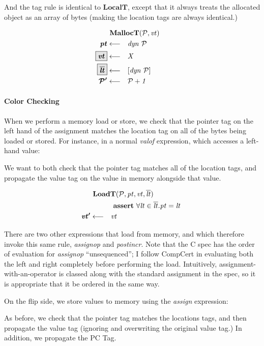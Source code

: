 \documentclass[acmsmall,review,anonymous]{acmart}\settopmatter{printfolios=true,printccs=false,printacmref=false}
\begin{document}
\allocstep

And the tag rule is identical to \(\mathbf{LocalT}\), except that it always treats the allocated
object as an array of bytes (making the location tags are always identical.)

\[\begin{aligned}
\truledef{\malloct}
\settag{\pt}{dyn ~ \PCT}
\settagopt{\vt}{X}
\settagopt{\overline{\lt}}{\left[dyn ~ \PCT\right]}
\settag{\PCT'}{\PCT + 1}
\end{aligned}\]

\paragraph*{Color Checking}

When we perform a memory load or store, we check that the pointer tag on the left hand
of the assignment matches the location tag on all of the bytes being loaded or stored.
For instance, in a normal {\it valof} expression, which accesses a left-hand value:

\valofstep

We want to both check that the pointer tag matches all of the location tags, and propagate the
value tag on the value in memory alongside that value.

\[\begin{aligned}
\truledef{\loadt}
\assert{\forall \lt \in \overline{\lt} . \pt = \lt}
\settag{\vt'}{\vt}
\end{aligned}\]

There are two other expressions that load from memory, and which therefore invoke
this same rule, {\it assignop} and {\it postincr}. Note that the C spec has the order
of evaluation for {\it assignop} ``unsequenced''; I follow CompCert in evaluating both the left
and right completely before performing the load. Intuitively, assignment-with-an-operator is
classed along with the standard assignment in the spec, so it is appropriate that it be ordered
in the same way.

\assignopstep

\postincstep

On the flip side, we store values to memory using the {\it assign} expression:

\assignstep

As before, we check that the pointer tag matches the locations tags, and then propagate the
value tag (ignoring and overwriting the original value tag.) In addition, we propagate the PC Tag.
                  
\end{document}
